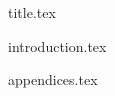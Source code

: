 \documentclass[final]{scrreprt} %
\begin{document}

{title.tex}
\newpage
\tableofcontents

\newpage
{}
{introduction.tex}

\newpage
{}

\printbibliography
{appendices.tex}
\end{document}
